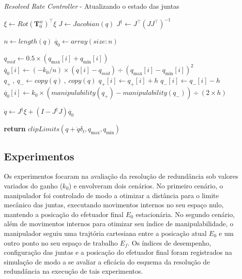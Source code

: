 \begin{algorithm}
    \caption{\emph{Resolved Rate Controller} {-} Atualizando o estado das juntas}\label{rrc-alg}
    \begin{algorithmic}[1]
        \State$\xi \gets {Rot(\mathbf{T}^w_0)}^\top \xi$
        \State$J \gets Jacobian(q)$
        \State$J^\dag \gets J^\top {(J J^\top)}^{-1}$

        \State$n \gets length(q)$
        \State$\dot{q_0} \gets array(size: n)$

         
        \State$q_{mid} \gets 0.5 \times (q_{\max}[i] + q_{\min}[i])$
        \State$\dot{q_0}[i] \gets (-k_0 / n) \times (q[i] - q_{mid}) \div {{(q_{\max}[i] - q_{\min}[i])}^2}$
        \State$q_{+} \ , \ q_{-} \gets copy(q) \ , \ copy(q)$
        \State$q_{+}[i] \gets q_{+}[i] + h$
        \State$q_{-}[i] \gets q_{-}[i] - h$
        \State$\dot{q_0}[i] \gets k_0 \times (manipulability(q_{+}) - manipulability(q_{-})) \div (2 \times h)$
        \EndIf{}
        \EndFor{}

        \State$\dot{q} \gets J^\dag \xi + (I - J^\dag J) \dot{q_0}$

        \State\textbf{return} $clipLimits(q + \dot{q} \delta_t, q_{\max}, q_{\min})$ 
        \EndProcedure\end{algorithmic}
\end{algorithm}

\subsection*{Experimentos}

Os experimentos focaram na avaliação da resolução de redundância
sob valores variados do ganho (\(k_0\)) e envolveram dois cenários. No primeiro
cenário, o manipulador foi controlado de modo a otimizar a distância para o limite mecânico das juntas, 
executando movimentos internos no seu espaço nulo, mantendo a posicação do efetuador final \(E_0\) estacionária.
No segundo cenário, além de movimentos internos para otimizar seu índice de manipulabilidade, o manipulador 
seguiu uma trajtória cartesiana entre a posicação atual \(E_0\) e um outro ponto no seu espaço 
de trabalho \(E_f\). Os índices de desempenho, configuração das juntas e a 
posicação do efetuador final foram registrados na simulação de modo a se avaliar 
a eficácia do esquema da resolução de redundância na execução de tais experimentos.

